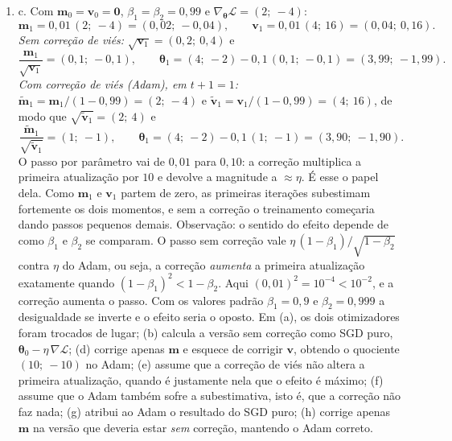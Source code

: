 \documentclass{dlproblemset}
\begin{document}
\begin{enumerate}[1)]
    \item c. Com $\mathbf{m}_0 = \mathbf{v}_0 = \mathbf{0}$, $\beta_1 = \beta_2 = 0{,}99$ e $\nabla_{\boldsymbol{\theta}}\mathcal{L} = (2;\ -4)$:
    \[
    \mathbf{m}_1 = 0{,}01\,(2;\ -4) = (0{,}02;\ -0{,}04),
    \qquad
    \mathbf{v}_1 = 0{,}01\,(4;\ 16) = (0{,}04;\ 0{,}16).
    \]
    \textit{Sem correção de viés:} $\sqrt{\mathbf{v}_1} = (0{,}2;\ 0{,}4)$ e
    \[
    \frac{\mathbf{m}_1}{\sqrt{\mathbf{v}_1}} = (0{,}1;\ -0{,}1),
    \qquad
    \boldsymbol{\theta}_1 = (4;\ -2) - 0{,}1\,(0{,}1;\ -0{,}1) = (3{,}99;\ -1{,}99).
    \]
    \textit{Com correção de viés (Adam), em $t + 1 = 1$:} $\widetilde{\mathbf{m}}_1 = \mathbf{m}_1/(1 - 0{,}99) = (2;\ -4)$ e $\widetilde{\mathbf{v}}_1 = \mathbf{v}_1/(1 - 0{,}99) = (4;\ 16)$, de modo que $\sqrt{\widetilde{\mathbf{v}}_1} = (2;\ 4)$ e
    \[
    \frac{\widetilde{\mathbf{m}}_1}{\sqrt{\widetilde{\mathbf{v}}_1}} = (1;\ -1),
    \qquad
    \boldsymbol{\theta}_1 = (4;\ -2) - 0{,}1\,(1;\ -1) = (3{,}90;\ -1{,}90).
    \]
    O passo por parâmetro vai de $0{,}01$ para $0{,}10$: a correção multiplica a primeira atualização por $10$ e devolve a magnitude a $\approx \eta$. É esse o papel dela. Como $\mathbf{m}_1$ e $\mathbf{v}_1$ partem de zero, as primeiras iterações subestimam fortemente os dois momentos, e sem a correção o treinamento começaria dando passos pequenos demais. Observação: o sentido do efeito depende de como $\beta_1$ e $\beta_2$ se comparam. O passo sem correção vale $\eta\,(1-\beta_1)/\sqrt{1-\beta_2}$ contra $\eta$ do Adam, ou seja, a correção \emph{aumenta} a primeira atualização exatamente quando $(1-\beta_1)^2 < 1-\beta_2$. Aqui $(0{,}01)^2 = 10^{-4} < 10^{-2}$, e a correção aumenta o passo. Com os valores padrão $\beta_1 = 0{,}9$ e $\beta_2 = 0{,}999$ a desigualdade se inverte e o efeito seria o oposto. Em (a), os dois otimizadores foram trocados de lugar; (b) calcula a versão sem correção como SGD puro, $\boldsymbol{\theta}_0 - \eta\,\nabla\mathcal{L}$; (d) corrige apenas $\mathbf{m}$ e esquece de corrigir $\mathbf{v}$, obtendo o quociente $(10;\ -10)$ no Adam; (e) assume que a correção de viés não altera a primeira atualização, quando é justamente nela que o efeito é máximo; (f) assume que o Adam também sofre a subestimativa, isto é, que a correção não faz nada; (g) atribui ao Adam o resultado do SGD puro; (h) corrige apenas $\mathbf{m}$ na versão que deveria estar \emph{sem} correção, mantendo o Adam correto.


\end{enumerate}
\end{document}
